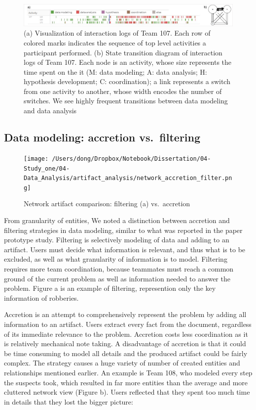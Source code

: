 \begin{figure}
\centering
\includegraphics[width=6.5in]{./img/intertwined.jpg}
\caption{(a) Visualization of interaction logs of Team 107. Each row of
colored marks indicates the sequence of top level activities a
participant performed. (b) State transition diagram of interaction logs of Team 107. Each node is an activity, whose size represents the time spent on the it (M: data modeling; A: data analysis; H: hypothesis development; C: coordination); a
link represents a switch from one activity to another, whose width
encodes the number of switches. We see highly frequent transitions between data modeling and data analysis \label{fig:intertwined}}
\end{figure}


\subsection{Data modeling: accretion
vs.~filtering}\label{data-modeling-accretion-vs.filtering}

\begin{figure}
\centering
\texttt{[image: /Users/dong/Dropbox/Notebook/Dissertation/04-Study\_one/04-Data\_Analysis/artifact\_analysis/network\_accretion\_filter.png]}
\caption{Network artifact comparison: filtering (a)
vs.~accretion\label{fig:network_accretion}}
\end{figure}

From granularity of entities, We noted a distinction between accretion
and filtering strategies in data modeling, similar to what was reported in the paper prototype study. Filtering is selectively modeling of data
and adding to an artifact. Users must decide what information is
relevant, and thus what is to be excluded, as well as what granularity
of information is to model. Filtering requires more team coordination,
because teammates must reach a common ground of the current problem as
well as information needed to answer the problem. Figure
\autocite{fig:network_accretion}a is an example of filtering,
represention only the key information of robberies.

Accretion is an attempt to comprehensively represent the problem by
adding all information to an artifact. Users extract every fact from the
document, regardless of its immediate relevance to the problem.
Accretion costs less coordination as it is relatively mechanical note
taking. A disadvantage of accretion is that it could be time consuming
to model all details and the produced artifact could be fairly complex.
The strategy causes a huge variety of number of created entities and
relationships mentioned earlier. An example is Team 108, who modeled
every step the suspects took, which resulted in far more entities than
the average and more cluttered network view (Figure
\autocite{fig:network_accretion}b). Users reflected that they spent too
much time in details that they lost the bigger picture:

